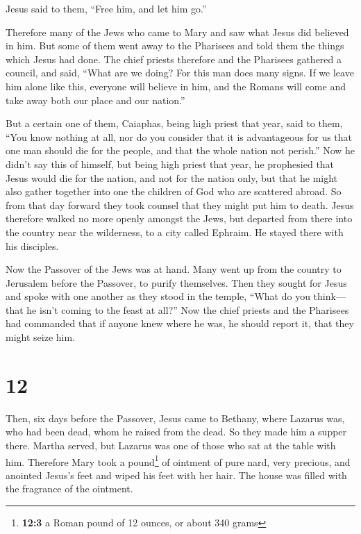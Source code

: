 Jesus said to them, ``Free him, and let him go.''

 Therefore many of the Jews who came to Mary and saw what
Jesus did believed in him.  But some of them went away to
the Pharisees and told them the things which Jesus had done.
 The chief priests therefore and the Pharisees gathered a
council, and said, ``What are we doing? For this man does many signs.
 If we leave him alone like this, everyone will believe
in him, and the Romans will come and take away both our place and our
nation.''

 But a certain one of them, Caiaphas, being high priest
that year, said to them, ``You know nothing at all,  nor
do you consider that it is advantageous for us that one man should die
for the people, and that the whole nation not perish.'' 
Now he didn't say this of himself, but being high priest that year, he
prophesied that Jesus would die for the nation,  and not
for the nation only, but that he might also gather together into one the
children of God who are scattered abroad.  So from that
day forward they took counsel that they might put him to death.
 Jesus therefore walked no more openly amongst the Jews,
but departed from there into the country near the wilderness, to a city
called Ephraim. He stayed there with his disciples.

 Now the Passover of the Jews was at hand. Many went up
from the country to Jerusalem before the Passover, to purify themselves.
 Then they sought for Jesus and spoke with one another as
they stood in the temple, ``What do you think---that he isn't coming to
the feast at all?''  Now the chief priests and the
Pharisees had commanded that if anyone knew where he was, he should
report it, that they might seize him.

\hypertarget{section-11}{%
\section{12}\label{section-11}}

 Then, six days before the Passover, Jesus came to
Bethany, where Lazarus was, who had been dead, whom he raised from the
dead.  So they made him a supper there. Martha served, but
Lazarus was one of those who sat at the table with him. 
Therefore Mary took a pound\footnote{\textbf{12:3} a Roman pound of 12
  ounces, or about 340 grams} of ointment of pure nard, very precious,
and anointed Jesus's feet and wiped his feet with her hair. The house
was filled with the fragrance of the ointment.

